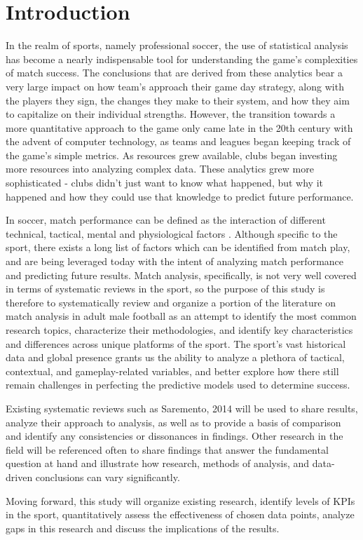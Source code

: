 
\chapter{Introduction}

In the realm of sports, namely professional soccer, the use of statistical analysis has become a nearly indispensable tool for understanding the game’s complexities of match success. The conclusions that are derived from these analytics bear a very large impact on how team’s approach their game day strategy, along with the players they sign, the changes they make to their system, and how they aim to capitalize on their individual strengths. However, the transition towards a more quantitative approach to the game only came late in the 20th century with the advent of computer technology, as teams and leagues began keeping track of the game's simple metrics. As resources grew available, clubs began investing more resources into analyzing complex data. These analytics grew more sophisticated - clubs didn't just want to know what happened, but why it happened and how they could use that knowledge to predict future performance.

In soccer, match performance can be defined as the interaction of different technical, tactical, mental and physiological factors \cite{Sarmento2014}. Although specific to the sport, there exists a long list of factors which can be identified from match play, and are being leveraged today with the intent of analyzing match performance and predicting future results. Match analysis, specifically, is not very well covered in terms of systematic reviews in the sport, so the purpose of this study is therefore to systematically review and organize a portion of the literature on match analysis in adult male football as an attempt to identify the most common research topics, characterize their methodologies, and identify key characteristics and differences across unique platforms of the sport. The sport's vast historical data and global presence grants us the ability to analyze a plethora of tactical, contextual, and gameplay-related variables, and better explore how there still remain challenges in perfecting the predictive models used to determine success. 

Existing systematic reviews such as  Saremento, 2014 \cite{Sarmento2014} will be used to share results, analyze their approach to analysis, as well as to provide a basis of comparison and identify any consistencies or dissonances in findings. Other research in the field will be referenced often to share findings that answer the fundamental question at hand and illustrate how research, methods of analysis, and data-driven conclusions can vary significantly. 

Moving forward, this study will organize existing research, identify levels of KPIs in the sport, quantitatively assess the effectiveness of chosen data points, analyze gaps in this research and  discuss the implications of the results. 

